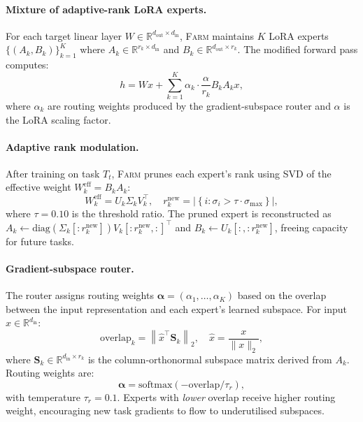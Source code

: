 \documentclass{article}
\newcommand{\FARM}{\textsc{Farm}}
\begin{document}
\paragraph{Mixture of adaptive-rank LoRA experts.}
For each target linear layer $W \in \mathbb{R}^{d_{\text{out}} \times d_{\text{in}}}$, \FARM{} maintains $K$ LoRA experts $\{(A_k, B_k)\}_{k=1}^K$ where $A_k \in \mathbb{R}^{r_k \times d_{\text{in}}}$ and $B_k \in \mathbb{R}^{d_{\text{out}} \times r_k}$. The modified forward pass computes:
\begin{equation}
    h = Wx + \sum_{k=1}^K \alpha_k \cdot \frac{\alpha}{r_k} B_k A_k x,
    \label{eq:farm_forward}
\end{equation}
where $\alpha_k$ are routing weights produced by the gradient-subspace router and $\alpha$ is the LoRA scaling factor.

\paragraph{Adaptive rank modulation.}
After training on task $T_t$, \FARM{} prunes each expert's rank using SVD of the effective weight $W_k^{\text{eff}} = B_k A_k$:
\begin{equation}
    W_k^{\text{eff}} = U_k \Sigma_k V_k^\top, \quad r_k^{\text{new}} = \left|\left\{i : \sigma_i > \tau \cdot \sigma_{\max}\right\}\right|,
    \label{eq:rank_prune}
\end{equation}
where $\tau = 0.10$ is the threshold ratio. The pruned expert is reconstructed as $A_k \leftarrow \text{diag}(\Sigma_k[:r_k^{\text{new}}]) V_k[:r_k^{\text{new}}, :]^\top$ and $B_k \leftarrow U_k[:, :r_k^{\text{new}}]$, freeing capacity for future tasks.

\paragraph{Gradient-subspace router.}
The router assigns routing weights $\bm{\alpha} = (\alpha_1, \ldots, \alpha_K)$ based on the overlap between the input representation and each expert's learned subspace. For input $x \in \mathbb{R}^{d_{\text{in}}}$:
\begin{equation}
    \text{overlap}_k = \left\| \hat{x}^\top \mathbf{S}_k \right\|_2, \quad \hat{x} = \frac{x}{\|x\|_2},
    \label{eq:overlap}
\end{equation}
where $\mathbf{S}_k \in \mathbb{R}^{d_{\text{in}} \times r_k}$ is the column-orthonormal subspace matrix derived from $A_k$. Routing weights are:
\begin{equation}
    \bm{\alpha} = \text{softmax}\left(-\text{overlap} / \tau_r\right),
    \label{eq:routing}
\end{equation}
with temperature $\tau_r = 0.1$. Experts with \emph{lower} overlap receive higher routing weight, encouraging new task gradients to flow to underutilised subspaces.
\end{document}
